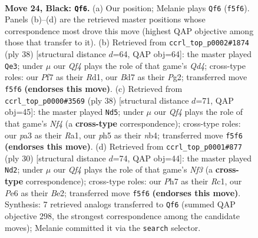 \documentclass[11pt]{article}
\begin{document}
\clearpage

\begin{figure}[p]\centering
\begin{subfigure}{0.46\textwidth}\centering
\resizebox{\linewidth}{!}{%
\newchessgame
\chessboard[
  setfen={1rr3k1/1p1b1ppp/2n1p3/2Pp1q1P/p2P3N/P1P5/R2QBPP1/2R2K2 b - - 6 24},
  showmover=false,
  pgfstyle=straightmove, color=movearrow, markmove={f5-f6}
]}
\caption{}
\end{subfigure}\hfill
\begin{subfigure}{0.46\textwidth}\centering
\resizebox{\linewidth}{!}{%
\newchessgame
\chessboard[
  setfen={r3r1k1/1q1n1ppp/1ppp1b2/p7/2PQP3/P1N3BP/1P3PP1/3R1RK1 w - - 1 20},
  showmover=false,
  pgfstyle=straightmove, color=movearrow, markmove={d4-e3}
]}
\caption{}
\end{subfigure}
\\[4pt]
\begin{subfigure}{0.46\textwidth}\centering
\resizebox{\linewidth}{!}{%
\newchessgame
\chessboard[
  setfen={r2qr1k1/1p3p1p/3p2p1/p3b3/Pn1pPNP1/1Q1P2P1/1P3P2/R1B2RK1 w - - 1 20},
  showmover=false,
  pgfstyle=straightmove, color=movearrow, markmove={f4-d5}
]}
\caption{}
\end{subfigure}\hfill
\begin{subfigure}{0.46\textwidth}\centering
\resizebox{\linewidth}{!}{%
\newchessgame
\chessboard[
  setfen={r1b2rk1/1p1nqpp1/2p4p/p7/2QPp3/4PN2/PP2BPPP/2RR2K1 w - - 0 16},
  showmover=false,
  pgfstyle=straightmove, color=movearrow, markmove={f3-d2}
]}
\caption{}
\end{subfigure}
\caption{\textbf{Move 24, Black: \texttt{Qf6}.} (a) Our position; Melanie plays \texttt{Qf6} (\texttt{f5f6}). Panels (b)--(d) are the retrieved master positions whose correspondence most drove this move (highest QAP objective among those that transfer to it). (b) Retrieved from \texttt{ccrl\_top\_p0002\#1874} (ply 38) [structural distance $d$=64, QAP obj=64]: the master played \texttt{Qe3}; under $\mu$ our \emph{Qf4} plays the role of that game's \emph{Qd4}; cross-type roles: our \emph{P}f7 as their \emph{R}d1, our \emph{B}d7 as their \emph{P}g2; transferred move \texttt{f5f6} \textbf{(endorses this move)}. (c) Retrieved from \texttt{ccrl\_top\_p0000\#3569} (ply 38) [structural distance $d$=71, QAP obj=45]: the master played \texttt{Nd5}; under $\mu$ our \emph{Qf4} plays the role of that game's \emph{Nf4} (a \textbf{cross-type} correspondence); cross-type roles: our \emph{p}a3 as their \emph{R}a1, our \emph{p}h5 as their \emph{n}b4; transferred move \texttt{f5f6} \textbf{(endorses this move)}. (d) Retrieved from \texttt{ccrl\_top\_p0001\#877} (ply 30) [structural distance $d$=74, QAP obj=44]: the master played \texttt{Nd2}; under $\mu$ our \emph{Qf4} plays the role of that game's \emph{Nf3} (a \textbf{cross-type} correspondence); cross-type roles: our \emph{P}h7 as their \emph{R}c1, our \emph{P}e6 as their \emph{B}e2; transferred move \texttt{f5f6} \textbf{(endorses this move)}. Synthesis: 7 retrieved analogs transferred to \texttt{Qf6} (summed QAP objective 298, the strongest correspondence among the candidate moves); Melanie committed it via the \texttt{search} selector.}
\label{fig:thought-m47}
\end{figure}
\end{document}
